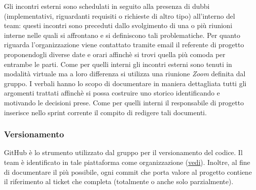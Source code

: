         Gli incontri esterni sono schedulati in seguito alla presenza di dubbi (implementativi, riguardanti requisiti o richieste di altro tipo) all'interno del 
        team: questi incontri sono preceduti dallo svolgimento di una o più riunioni interne nelle quali si affrontano e si definiscono tali problematiche.
        \newline
        Per quanto riguarda l'organizzazione viene contattato tramite email il referente di progetto proponendogli diverse date e orari affinchè si trovi quella 
        più comoda per entrambe le parti. 
        \newline
        Come per quelli interni gli incontri esterni sono tenuti in modalità virtuale ma a loro differenza si utilizza una riunione \textit{Zoom} definita dal gruppo. 
        \newline
        I verbali hanno lo scopo di documentare in maniera dettagliata tutti gli argomenti trattati affinchè si possa costruire uno storico identificando
        e motivando le decisioni prese.
        \newline
        Come per quelli interni il responsabile di progetto inserisce nello sprint corrente il compito di redigere tali documenti.

	\subsubsection{Versionamento}
	GitHub è lo strumento utilizzato dal gruppo per il versionamento del codice.
	\newline Il team è identificato in tale piattaforma come organizzazione (\href{https://github.com/catchEmAll-SWE}{vedi}).
	Inoltre, al fine di documentare il più possibile, ogni commit che porta valore al progetto contiene il riferimento al ticket che completa (totalmente o anche solo parzialmente). 


